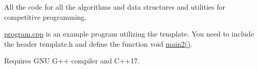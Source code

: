 All the code for all the algorithms and data structures and utilities for competitive programming.

\mbox{\hyperlink{program_8cpp}{program.\+cpp}} is an example program utilizing the template. You need to include the header template.\+h and define the function void \mbox{\hyperlink{main_8hpp_af095a232149097b5605064623a9345ac}{main2()}}.

Requires G\+NU G++ compiler and C++17. 